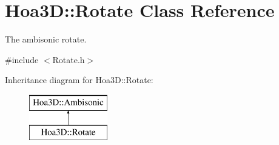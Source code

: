 \hypertarget{class_hoa3_d_1_1_rotate}{\section{Hoa3\-D\-:\-:Rotate Class Reference}
\label{class_hoa3_d_1_1_rotate}
}


The ambisonic rotate.  




{\ttfamily \#include $<$Rotate.\-h$>$}

Inheritance diagram for Hoa3\-D\-:\-:Rotate\-:\begin{figure}[H]
\begin{center}
\leavevmode
\includegraphics[height=2.000000cm]{class_hoa3_d_1_1_rotate}
\end{center}
\end{figure}
